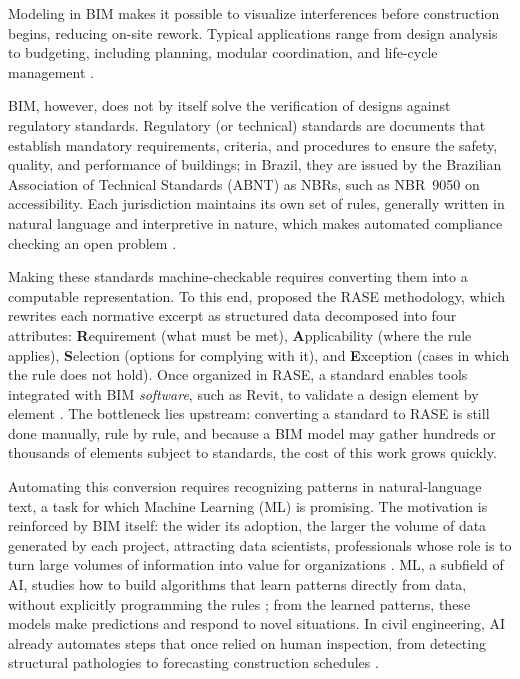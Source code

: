 \documentclass[a4paper,fleqn]{cas-sc}
\begin{document}
Modeling in BIM makes it possible to visualize interferences before construction begins, reducing on-site rework. Typical applications range from design analysis to budgeting, including planning, modular coordination, and life-cycle management \citep{eastman2011}.

BIM, however, does not by itself solve the verification of designs against regulatory standards. Regulatory (or technical) standards are documents that establish mandatory requirements, criteria, and procedures to ensure the safety, quality, and performance of buildings; in Brazil, they are issued by the Brazilian Association of Technical Standards (ABNT) as NBRs, such as NBR~9050 on accessibility. Each jurisdiction maintains its own set of rules, generally written in natural language and interpretive in nature, which makes automated compliance checking an open problem \citep{dimyadi2013,solihin2015}.

Making these standards machine-checkable requires converting them into a computable representation. To this end, \citet{hjelseth2011} proposed the RASE methodology, which rewrites each normative excerpt as structured data decomposed into four attributes: \textbf{R}equirement (what must be met), \textbf{A}pplicability (where the rule applies), \textbf{S}election (options for complying with it), and \textbf{E}xception (cases in which the rule does not hold). Once organized in RASE, a standard enables tools integrated with BIM \textit{software}, such as Revit, to validate a design element by element \citep{santos2021}. The bottleneck lies upstream: converting a standard to RASE is still done manually, rule by rule, and because a BIM model may gather hundreds or thousands of elements subject to standards, the cost of this work grows quickly.

Automating this conversion requires recognizing patterns in natural-language text, a task for which Machine Learning (ML) is promising. The motivation is reinforced by BIM itself: the wider its adoption, the larger the volume of data generated by each project, attracting data scientists, professionals whose role is to turn large volumes of information into value for organizations \citep{davenport2012}. ML, a subfield of AI, studies how to build algorithms that learn patterns directly from data, without explicitly programming the rules \citep{tan2006}; from the learned patterns, these models make predictions and respond to novel situations. In civil engineering, AI already automates steps that once relied on human inspection, from detecting structural pathologies to forecasting construction schedules \citep{rane2023,liu2022}.
\end{document}
